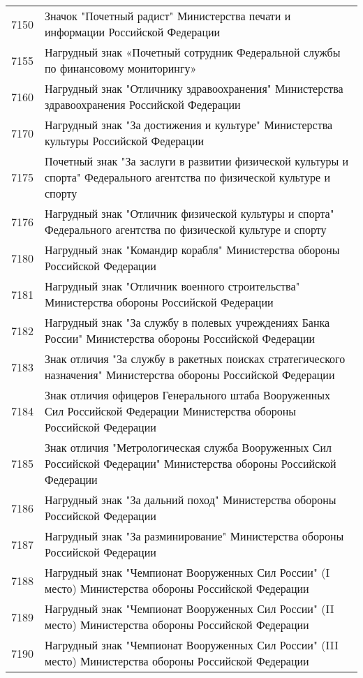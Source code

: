 \documentclass[10pt, a4paper, titlepage]{article}
\begin{document}
\begin{center}
\begin{longtable}{rp{}}
        7150 & Значок "Почетный радист" Министерства печати и информации Российской Федерации \\
        7155 & Нагрудный знак «Почетный сотрудник Федеральной службы по финансовому мониторингу» \\
        7160 & Нагрудный знак "Отличнику здравоохранения" Министерства здравоохранения Российской Федерации \\
        7170 & Нагрудный знак "За достижения и культуре" Министерства культуры Российской Федерации \\
        7175 & Почетный знак "За заслуги в развитии физической культуры и спорта" Федерального агентства по физической культуре и спорту \\
        7176 & Нагрудный знак "Отличник физической культуры и спорта" Федерального агентства по физической культуре и спорту \\
        7180 & Нагрудный знак "Командир корабля" Министерства обороны Российской Федерации \\
        7181 & Нагрудный знак "Отличник военного строительства" Министерства обороны Российской Федерации \\
        7182 & Нагрудный знак "За службу в полевых учреждениях Банка России" Министерства обороны Российской Федерации \\
        7183 & Знак отличия "За службу в ракетных поисках стратегического назначения" Министерства обороны Российской Федерации \\
        7184 & Знак отличия офицеров Генерального штаба Вооруженных Сил Российской Федерации Министерства обороны Российской Федерации \\
        7185 & Знак отличия "Метрологическая служба Вооруженных Сил Российской Федерации" Министерства обороны Российской Федерации \\
        7186 & Нагрудный знак "За дальний поход" Министерства обороны Российской Федерации \\
        7187 & Нагрудный знак "За разминирование" Министерства обороны Российской Федерации \\
        7188 & Нагрудный знак "Чемпионат Вооруженных Сил России" (I место) Министерства обороны Российской Федерации \\
        7189 & Нагрудный знак "Чемпионат Вооруженных Сил России" (II место) Министерства обороны Российской Федерации \\
        7190 & Нагрудный знак "Чемпионат Вооруженных Сил России" (III место) Министерства обороны Российской Федерации \\

\end{longtable}
\end{center}
\end{document}
